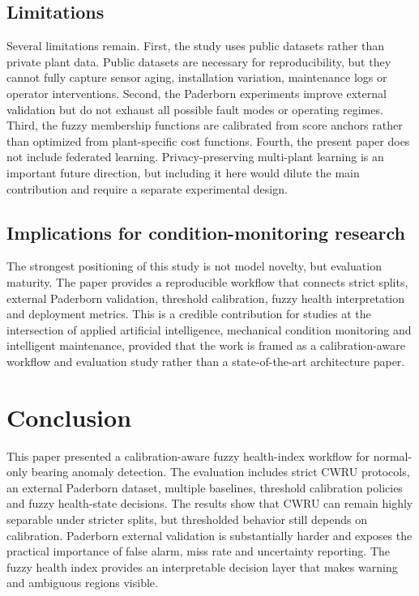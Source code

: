 \documentclass[pdflatex,sn-mathphys-num]{sn-jnl}
\begin{document}
\subsection{Limitations}

Several limitations remain. First, the study uses public datasets rather than private plant data. Public datasets are necessary for reproducibility, but they cannot fully capture sensor aging, installation variation, maintenance logs or operator interventions. Second, the Paderborn experiments improve external validation but do not exhaust all possible fault modes or operating regimes. Third, the fuzzy membership functions are calibrated from score anchors rather than optimized from plant-specific cost functions. Fourth, the present paper does not include federated learning. Privacy-preserving multi-plant learning is an important future direction, but including it here would dilute the main contribution and require a separate experimental design.

\subsection{Implications for condition-monitoring research}

The strongest positioning of this study is not model novelty, but evaluation maturity. The paper provides a reproducible workflow that connects strict splits, external Paderborn validation, threshold calibration, fuzzy health interpretation and deployment metrics. This is a credible contribution for studies at the intersection of applied artificial intelligence, mechanical condition monitoring and intelligent maintenance, provided that the work is framed as a calibration-aware workflow and evaluation study rather than a state-of-the-art architecture paper.

\section{Conclusion}
\label{sec:conclusion}

This paper presented a calibration-aware fuzzy health-index workflow for normal-only bearing anomaly detection. The evaluation includes strict CWRU protocols, an external Paderborn dataset, multiple baselines, threshold calibration policies and fuzzy health-state decisions. The results show that CWRU can remain highly separable under stricter splits, but thresholded behavior still depends on calibration. Paderborn external validation is substantially harder and exposes the practical importance of false alarm, miss rate and uncertainty reporting. The fuzzy health index provides an interpretable decision layer that makes warning and ambiguous regions visible.
\end{document}
